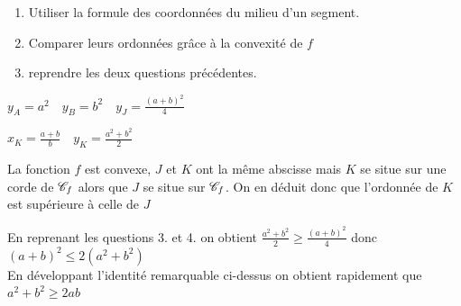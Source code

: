 \documentclass[oneside,12pt]{book}          %
\begin{document}
\begin{hint}
	\begin{enumerate}
		\item[3.] Utiliser la formule des coordonnées du milieu d'un segment.
		\item[4.] Comparer leurs ordonnées grâce à la convexité de $f$
		\item[5.] reprendre les deux questions précédentes.
	\end{enumerate}
\end{hint}
\begin{sol}
	\begin{enumerate}
	\begin{minipage}{0.5\linewidth}
		\item {}
    	\end{minipage}
    	\begin{minipage}{0.5\linewidth}
    	\item $y_A=a^2 \quad y_B=b^2 \quad y_J=\frac{(a+b)^2}{4}$\\
    	\item $x_K=\frac{a+b}{b} \quad y_K=\frac{a^2+b^2}{2}$\\
    	\item La fonction $f$ est convexe, $J$ et $K$ ont la même abscisse mais $K$ se situe sur une corde de ${\mathscr{C}}_f$ alors que $J$ se situe sur ${\mathscr{C}}_f$. On en déduit donc que l'ordonnée de $K$ est supérieure à celle de $J$\\
    	\item En reprenant les questions 3. et 4. on obtient $\frac{a^2+b^2}{2}\geq\frac{(a+b)^2}{4}$ donc $(a+b)^2\leq2(a^2+b^2)$\\
    	En développant l'identité remarquable ci-dessus on obtient rapidement que $a^2+b^2\geq2ab$
    	\end{minipage}
	\end{enumerate}
\end{sol}
\end{document}
